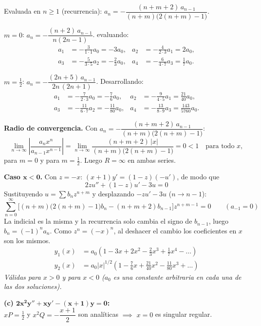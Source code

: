 \documentclass[11pt, a4paper]{article}
\begin{document}
\smallskip\noindent Evaluada en $n\geq1$ (recurrencia): $a_n=-\dfrac{(n+m+2)\,a_{n-1}}{(n+m)\big(2(n+m)-1\big)}$.

\smallskip\noindent $m=0$: $a_n=-\dfrac{(n+2)\,a_{n-1}}{n(2n-1)}$. evaluando:
\begin{align*}
a_1&=-\frac{3}{1\cdot1}a_0=-3a_0, & a_2&=-\frac{4}{2\cdot3}a_1=2a_0, \\
a_3&=-\frac{5}{3\cdot5}a_2=-\frac23a_0, & a_4&=-\frac{6}{4\cdot7}a_3=\frac17a_0.
\end{align*}

\smallskip\noindent $m=\tfrac12$: $a_n=-\dfrac{(2n+5)\,a_{n-1}}{2n\,(2n+1)}$. Desarrollando:
\begin{align*}
a_1&=-\frac{7}{2\cdot3}a_0=-\frac76a_0, & a_2&=-\frac{9}{4\cdot5}a_1=\frac{21}{40}a_0, \\
a_3&=-\frac{11}{6\cdot7}a_2=-\frac{11}{80}a_0, & a_4&=-\frac{13}{8\cdot9}a_3=\frac{143}{5760}a_0.
\end{align*}

\smallskip\noindent\textbf{Radio de convergencia.} Con $a_n=-\dfrac{(n+m+2)\,a_{n-1}}{(n+m)\big(2(n+m)-1\big)}$:
\[
\lim_{n\to\infty}\left|\frac{a_{n}x^{n}}{a_{n-1}x^{n-1}}\right|=\lim_{n\to\infty}\frac{(n+m+2)\,|x|}{(n+m)\big(2(n+m)-1\big)}=0<1 \quad\text{para todo }x,
\]
para $m=0$ y para $m=\tfrac12$. Luego $R=\infty$ en ambas series.

\vspace{0.2cm}\noindent\textbf{Caso $\bm{x<0}$.} Con $z=-x$: $(x+1)y'=(1-z)(-u')$, de modo que
\[
2zu''+(1-z)u'-3u=0
\]
Sustituyendo $u=\sum b_nz^{n+m}$ y desplazando $-zu'-3u$ ($n\to n-1$):
\[
\sum_{n=0}^\infty\Big[(n+m)\big(2(n+m)-1\big)b_n-(n+m+2)b_{n-1}\Big]z^{n+m-1}=0 \qquad (a_{-1}=0)
\]
La indicial es la misma y la recurrencia solo cambia el signo de $b_{n-1}$, luego $b_n=(-1)^na_n$. Como $z^n=(-x)^n$, al deshacer el cambio los coeficientes en $x$ son los mismos.
\[
\boxed{\begin{aligned}
y_1(x)&=a_0\left(1-3x+2x^2-\frac23x^3+\frac17x^4-\dots\right) \\[2pt]
y_2(x)&=a_0|x|^{1/2}\left(1-\frac76x+\frac{21}{40}x^2-\frac{11}{80}x^3+\dots\right)
\end{aligned}}
\]
\textit{Válidas para $x>0$ y para $x<0$ ($a_0$ es una constante arbitraria en cada una de las dos soluciones).}

\medskip
\noindent\textbf{(c) $\bm{2x^2y''+xy'-(x+1)y=0}$:} \\
$xP=\tfrac12$ y $x^2Q=-\dfrac{x+1}{2}$ son analíticas $\implies$ $x=0$ es singular regular.
\end{document}
